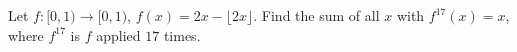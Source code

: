 Let $f\colon[0,1)\to[0,1)$, $f(x)=2x-\lfloor2x\rfloor$. Find the sum of all $x$ with $f^{17}(x)=x$, where $f^{17}$ is $f$ applied $17$ times.
